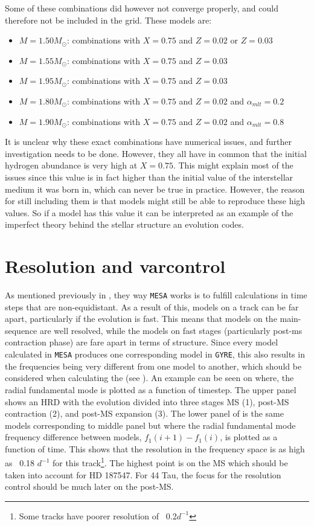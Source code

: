 Some of these combinations did however not converge properly, and could therefore not be included in the grid. These models are:
\begin{itemize}
	\item $M=1.50M_\odot$: combinations with $X=0.75$ and $Z=0.02$ or $Z=0.03$
	\item $M=1.55M_\odot$: combinations with $X=0.75$ and $Z=0.03$
	\item $M=1.95M_\odot$: combinations with $X=0.75$ and $Z=0.03$
	\item $M=1.80M_\odot$: combinations with $X=0.75$ and $Z=0.02$ and $\alpha_{mlt} = 0.2$
	\item $M=1.90M_\odot$: combinations with $X=0.75$ and $Z=0.02$ and $\alpha_{mlt} = 0.8$ 
\end{itemize}

It is unclear why these exact combinations have numerical issues, and further investigation needs to be done. However, they all have in common that the initial hydrogen abundance is very high at $X=0.75$. This might explain most of the issues since this value is in fact higher than the initial value of the interstellar medium it was born in, which can never be true in practice. However, the reason for still including them is that models might still be able to reproduce these high values. So if a model has this value it can be interpreted as an example of the imperfect theory behind the stellar structure an evolution codes.  

\section{Resolution and varcontrol}
\label{sec:res}

As mentioned previously in , they way \texttt{MESA} works is to fulfill calculations in time steps that are non-equidistant. As a result of this, models on a track can be far apart, particularly if the evolution is fast. This means that models on the main-sequence are well resolved, while the models on fast stages (particularly post-ms contraction phase) are fare apart in terms of structure. Since every model calculated in \texttt{MESA} produces one corresponding model in \texttt{GYRE}, this also results in the frequencies being very different from one model to another, which should be considered when calculating the \chis (see ). An example can be seen on  where, the radial fundamental mode is plotted as a function of timestep. The upper panel shows an HRD with the evolution divided into three stages MS (1), post-MS contraction (2), and post-MS expansion (3). The lower panel of  is the same models corresponding to middle panel but where the radial fundamental mode frequency difference between models, $f_1(i+1) - f_1(i)$, is plotted as a function of time. This shows that the resolution in the frequency space is as high as ~0.18 $d^{-1}$ for this track\footnote{Some tracks have poorer resolution of ~0.2$d^{-1}$}. The highest point is on the MS which should be taken into account for HD 187547. For 44 Tau, the focus for the resolution control should be much later on the post-MS.      


